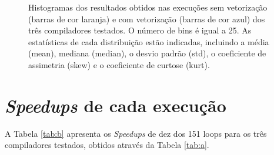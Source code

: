 \begin{figure}[ht!]
	\vspace{0mm}	%
	\begin{center}
	\end{center}
	\vspace{2mm}	%
	\caption{Histogramas dos resultados obtidos nas execuções sem vetorização (barras de cor laranja) e com vetorização (barras de cor azul) dos três compiladores testados. O número de bins é igual a 25. As estatísticas de cada distribuição estão indicadas, incluindo a média (\textsf{mean}), mediana (\textsf{median}), o desvio padrão (\textsf{std}), o coeficiente de assimetria (\textsf{skew}) e o coeficiente de curtose (\textsf{kurt}).}
	\legenda{}	%
	\label{fig:a}
\end{figure}


\section{\textit{Speedups} de cada execução}

A Tabela \ref{tab:b} apresenta os \textit{Speedups} de dez dos 151 loops para os três compiladores testados, obtidos através da Tabela \ref{tab:a}.

